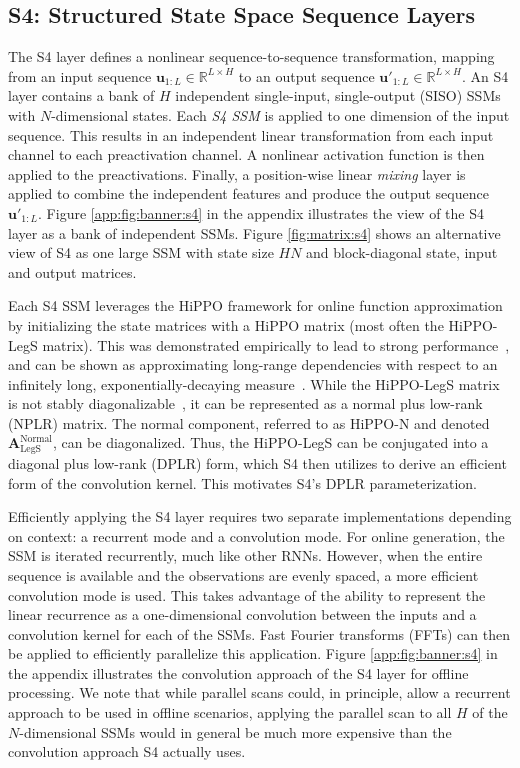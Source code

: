 \subsection{S4: Structured State Space Sequence Layers}
\label{background:S4}
The S4 layer \citep{gu2021s4} defines a nonlinear sequence-to-sequence transformation, mapping from an input sequence $\mathbf{u}_{1:L} \in \mathbb{R}^{L \times H}$ to an output sequence $\mathbf{u}'_{1:L} \in \mathbb{R}^{L \times H}$.  An S4 layer contains a bank of $H$ independent single-input, single-output (SISO) SSMs with $N$-dimensional states. Each \emph{S4 SSM} is applied to one dimension of the input sequence.  This results in an independent linear transformation from each input channel to each preactivation channel.  A nonlinear activation function is then applied to the preactivations.  Finally, a position-wise linear \emph{mixing} layer is applied to combine the independent features and produce the output sequence $\mathbf{u}'_{1:L}$.  Figure \ref{app:fig:banner:s4} in the appendix illustrates the view of the S4 layer as a bank of independent SSMs. Figure \ref{fig:matrix:s4} shows an alternative view of S4 as one large SSM with state size $HN$ and block-diagonal state, input and output matrices.  

Each S4 SSM leverages the HiPPO framework for online function approximation~\citep{gu2020hippo} by initializing the state matrices with a HiPPO matrix (most often the HiPPO-LegS matrix).  This was demonstrated empirically to lead to strong performance~\citep{gu2021lssl, gu2021s4}, and can be shown as approximating long-range dependencies with respect to an infinitely long, exponentially-decaying measure~\citep{gu2022train}.  While the HiPPO-LegS matrix is not stably diagonalizable~\citep{gu2021s4}, it can be represented as a normal plus low-rank (NPLR) matrix.   The normal component, referred to as HiPPO-N and denoted $\mathbf{A}_{\mathrm{LegS}}^{\mathrm{Normal}}$, can be diagonalized.  Thus, the HiPPO-LegS can be conjugated into a diagonal plus low-rank (DPLR) form, which S4 then utilizes to derive an efficient form of the convolution kernel.  This motivates S4's DPLR parameterization.

Efficiently applying the S4 layer requires two separate implementations depending on context: a recurrent mode and a convolution mode.  For online generation, the SSM is iterated recurrently, much like other RNNs.  However, when the entire sequence is available and the observations are evenly spaced, a more efficient convolution mode is used.  This takes advantage of the ability to represent the linear recurrence as a one-dimensional convolution between the inputs and a convolution kernel for each of the SSMs.  Fast Fourier transforms (FFTs) can then be applied to efficiently parallelize this application.  Figure \ref{app:fig:banner:s4} in the appendix illustrates the convolution approach of the S4 layer for offline processing.  We note that while parallel scans could, in principle, allow a recurrent approach to be used in offline scenarios, applying the parallel scan to all $H$ of the $N$-dimensional SSMs would in general be much more expensive than the convolution approach S4 actually uses.

